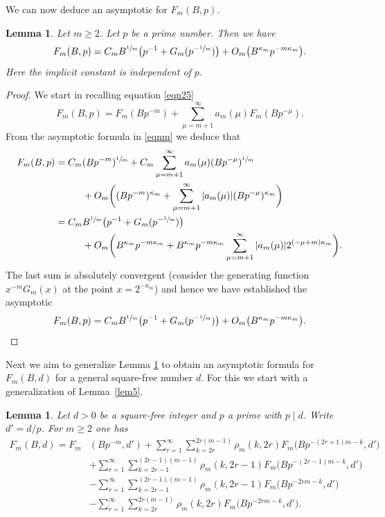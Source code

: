 \documentclass[11pt]{article}
\numberwithin{equation}{section}
\let\kap\kappa
\newtheorem{lemma}[theorem]{Lemma}
\theoremstyle{definition}
\numberwithin{theorem}{section}
\begin{document}
We can now deduce an asymptotic for $F_m(B,p)$.

\begin{lemma}\label{lem6}
Let $m\geq 2$.
Let $p$ be a prime number. Then we have
\[
F_m(B,p)=C_mB^{\sfrac{1}{m}} \bigl(p^{-1}+G_m(p^{-\sfrac{1}{m}})\bigr)+ O_m\bigl(B^{\kap_m}p^{-m\kap_m}\bigr).
\]
Here the implicit constant is independent of $p$.
\end{lemma}

\begin{proof}
We start in recalling equation \eqref{eqn25}
\begin{equation*}
F_m(B,p) = F_m(Bp^{-m}) +\sum_{\mu=m+1}^\infty a_m(\mu) F_m(Bp^{-\mu}).
\end{equation*}
From the asymptotic formula in \eqref{eqnm} we deduce that
\begin{equation*}
\begin{split}
F_m(B,p) =C_m&(Bp^{-m})^{\sfrac{1}{m}} +C_m\sum_{\mu=m+1}^\infty a_m(\mu) (Bp^{-\mu})^{\sfrac{1}{m}}\\ &+O_m\biggl((Bp^{-m})^{\kap_m}+ \sum_{\mu=m+1}^\infty |a_m(\mu)| (Bp^{-\mu})^{\kap_m} \biggr)\\
= C_m&B^{\sfrac{1}{m}} \bigl(p^{-1}+G_m(p^{-\sfrac{1}{m}})\bigr)\\& +O_m\biggl(B^{\kap_m}p^{-m\kap_m}+B^{\kap_m}p^{-m\kap_m}\sum_{\mu=m+1}^{\infty}|a_m(\mu)|2^{(-\mu+m)\kap_m}\biggr).
\end{split}
\end{equation*}
The last sum is absolutely convergent (consider the generating function $x^{-m}G_m(x)$ at the point $x=2^{-\kap_m}$) and hence we have established the asymptotic
\[
F_m(B,p)=C_mB^{\sfrac{1}{m}} \bigl(p^{-1}+G_m(p^{-\sfrac{1}{m}})\bigr)+ O_m\bigl(B^{\kap_m}p^{-m\kap_m}\bigr). \qedhere
\]
\end{proof}

Next we aim to generalize Lemma \ref{lem6} to obtain an asymptotic formula for $F_m(B,d)$ for a general square-free number $d$. For this we start with a generalization of Lemma~\ref{lem5}.

\begin{lemma}\label{lem7}
Let $d>0$ be a square-free integer and $p$ a prime with $p\mid d$. Write $d'=d/p$. For $m\geq 2$ one has
\begin{equation*}
\begin{split}
F_m(B,d) =F_m&(Bp^{-m},d') +\sum_{r=1}^{\infty} \sum_{k=2r}^{2r(m-1)}\rho_m(k,2r)F_m\bigl(Bp^{-(2r+1)m-k},d'\bigr)\\
&+ \sum_{r=1}^\infty\sum_{k=2r-1}^{(2r-1)(m-1)}\rho_m(k,2r-1)F_m\bigl(Bp^{-(2r-1)m-k},d'\bigr)\\
&-\sum_{r=1}^\infty \sum_{k=2r-1}^{(2r-1)(m-1)}\rho_m(k,2r-1)F_m\bigl(Bp^{-2rm-k},d'\bigr)\\
&-\sum_{r=1}^\infty\sum_{k=2r}^{2r(m-1)}\rho_m(k,2r)F_m\bigl(Bp^{-2rm-k},d'\bigr).
\end{split}
\end{equation*}
\end{lemma}
\end{document}
